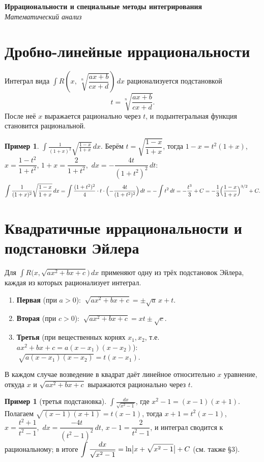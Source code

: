 \documentclass[11pt,a4paper]{article}
\newcommand{\coursename}{Математический анализ}
\newcommand{\doctitle}{Иррациональности и специальные методы интегрирования}
\theoremstyle{definition}
\newtheorem{example}[definition]{Пример}
\theoremstyle{plain}
\newcommand{\dx}{\,dx}
\newcommand{\dt}{\,dt}
\DeclarePairedDelimiter{\abs}{\lvert}{\rvert}
\begin{document}
\begin{center}
  {\LARGE\bfseries \doctitle}\\[4pt]
  {\large\itshape \coursename}
\end{center}
\vspace{6pt}

\section{Дробно-линейные иррациональности}

Интеграл вида $\displaystyle\int R\!\left(x,\ \sqrt[n]{\dfrac{ax+b}{cx+d}}\right)\dx$ рационализуется
подстановкой
\[
  t=\sqrt[n]{\frac{ax+b}{cx+d}} .
\]
После неё $x$ выражается рационально через $t$, и подынтегральная функция становится рациональной.

\begin{example}
$\displaystyle\int\frac{1}{(1+x)^2}\sqrt{\frac{1-x}{1+x}}\dx$. Берём $t=\sqrt{\dfrac{1-x}{1+x}}$, тогда
$1-x=t^2(1+x)$, $x=\dfrac{1-t^2}{1+t^2}$, $1+x=\dfrac{2}{1+t^2}$, $\dx=-\dfrac{4t}{(1+t^2)^2}\dt$:
\[
  \int\frac{1}{(1+x)^2}\sqrt{\frac{1-x}{1+x}}\dx
   =\int\frac{(1+t^2)^2}{4}\cdot t\cdot\Bigl(-\frac{4t}{(1+t^2)^2}\Bigr)\dt
   =-\int t^2\dt=-\frac{t^3}{3}+C=-\frac13\Bigl(\frac{1-x}{1+x}\Bigr)^{3/2}+C.
\]
\end{example}

\section{Квадратичные иррациональности и подстановки Эйлера}

Для $\displaystyle\int R\bigl(x,\sqrt{ax^2+bx+c}\bigr)\dx$ применяют одну из трёх подстановок Эйлера,
каждая из которых рационализует интеграл.
\begin{enumerate}[label=\arabic*),leftmargin=*]
  \item \textbf{Первая} (при $a>0$): $\ \sqrt{ax^2+bx+c}=\pm\sqrt{a}\,x+t$.
  \item \textbf{Вторая} (при $c>0$): $\ \sqrt{ax^2+bx+c}=xt\pm\sqrt{c}$.
  \item \textbf{Третья} (при вещественных корнях $x_1,x_2$, т.е. $ax^2+bx+c=a(x-x_1)(x-x_2)$):
        $\ \sqrt{a(x-x_1)(x-x_2)}=t(x-x_1)$.
\end{enumerate}
В каждом случае возведение в квадрат даёт линейное относительно $x$ уравнение, откуда $x$ и
$\sqrt{ax^2+bx+c}$ выражаются рационально через $t$.

\begin{example}[третья подстановка]
$\displaystyle\int\frac{dx}{\sqrt{x^2-1}}$, где $x^2-1=(x-1)(x+1)$. Полагаем
$\sqrt{(x-1)(x+1)}=t(x-1)$, тогда $x+1=t^2(x-1)$, $x=\dfrac{t^2+1}{t^2-1}$,
$\dx=\dfrac{-4t}{(t^2-1)^2}\dt$, $x-1=\dfrac{2}{t^2-1}$, и интеграл сводится к рациональному; в
итоге $\displaystyle\int\frac{dx}{\sqrt{x^2-1}}=\ln\abs[\big]{x+\sqrt{x^2-1}}+C$ (см. также §3).
\end{example}
\end{document}

